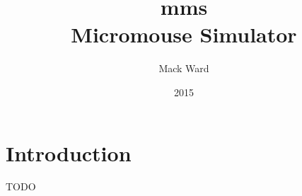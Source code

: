 \documentclass[12pt]{article}
\begin{document}
\renewcommand{\l}{\left(}
\renewcommand{\r}{\right)}

\title{\vspace{60mm}\textbf{mms}\\Micromouse Simulator}
\author{Mack Ward}
\date{2015}
\maketitle

\newpage
\renewcommand*\contentsname{Table of Contents}
\tableofcontents

\newpage
\section{Introduction}
TODO
\end{document}
